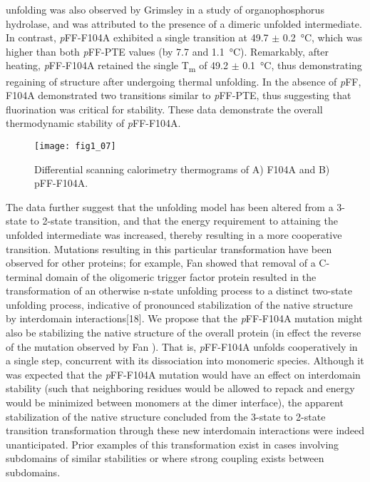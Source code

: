 \begin{refsection}
unfolding was also observed by Grimsley   in a study of
organophosphorus hydrolase, and was attributed to the presence of a dimeric
unfolded intermediate\cite{Grimsley1997b}. In contrast, \emph{p}FF-F104A
exhibited a single transition at 49.7 $\pm$ \SI{0.2}{\celsius}, which was
higher than both \emph{p}FF-PTE values (by 7.7 and \SI{1.1}{\celsius}).
Remarkably, after heating, \emph{p}FF-F104A retained the single
T\textsubscript{m} of 49.2 $\pm$ \SI{0.1}{\celsius}, thus demonstrating
regaining of structure after undergoing thermal unfolding.  In the absence of
\emph{p}FF, F104A demonstrated two transitions similar to \emph{p}FF-PTE, thus
suggesting that fluorination was critical for stability.  These data
demonstrate the overall thermodynamic stability of \emph{p}FF-F104A.
\begin{figure}[h!] \centering \texttt{[image: fig1\_07]}
    \caption[Differential scanning calorimetry thermograms of (A) F104A and (B)
    \emph{p}FF-F104A.]{Differential scanning calorimetry thermograms of A)
    F104A and B) pFF-F104A.} \label{fig:DSC-fig} 
\end{figure}

The data further suggest that the unfolding model has been altered
from a 3-state to 2-state transition, and that the energy requirement to
attaining the unfolded intermediate was increased, thereby resulting in a more
cooperative transition. Mutations resulting in this particular transformation
have been observed for other proteins; for example, Fan  showed
that removal of a C-terminal domain of the oligomeric  trigger
factor protein resulted in the transformation of an otherwise n-state unfolding
process to a distinct two-state unfolding process, indicative of pronounced
stabilization of the native structure by interdomain interactions[18]. We
propose that the \emph{p}FF-F104A mutation might also be stabilizing the native
structure of the overall protein (in effect the reverse of the mutation
observed by Fan )\cite{Fan2008}. That is, \emph{p}FF-F104A unfolds
cooperatively in a single step, concurrent with its dissociation into monomeric
species. Although it was expected that the \emph{p}FF-F104A mutation would have an
effect on interdomain stability (such that neighboring residues would be
allowed to repack and energy would be minimized between monomers at the dimer
interface), the apparent stabilization of the native structure concluded from
the 3-state to 2-state transition transformation through these new interdomain
interactions were indeed unanticipated. Prior examples of this transformation
exist in cases involving subdomains of similar stabilities or where strong
coupling exists between subdomains\cite{Tsytlonok2013}.


\end{refsection}
